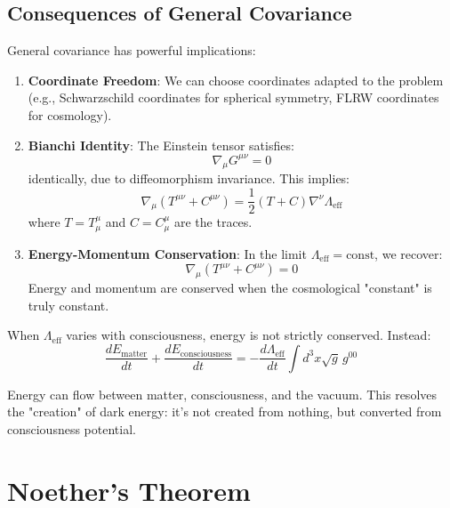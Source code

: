 \subsection{Consequences of General Covariance}

General covariance has powerful implications:

\begin{enumerate}
\item \textbf{Coordinate Freedom}: We can choose coordinates adapted to the problem (e.g., Schwarzschild coordinates for spherical symmetry, FLRW coordinates for cosmology).

\item \textbf{Bianchi Identity}: The Einstein tensor satisfies:
\begin{equation}
\nabla_\mu G^{\mu\nu} = 0
\end{equation}
identically, due to diffeomorphism invariance. This implies:
\begin{equation}
\nabla_\mu \left( T^{\mu\nu} + C^{\mu\nu} \right) = \frac{1}{2}\left( T + C \right) \nabla^\nu \Lambda_{\text{eff}}
\end{equation}
where $T = T^\mu_\mu$ and $C = C^\mu_\mu$ are the traces.

\item \textbf{Energy-Momentum Conservation}: In the limit $\Lambda_{\text{eff}} = \text{const}$, we recover:
\begin{equation}
\nabla_\mu \left( T^{\mu\nu} + C^{\mu\nu} \right) = 0
\end{equation}
Energy and momentum are conserved when the cosmological "constant" is truly constant.
\end{enumerate}

\begin{keyidea}
When $\Lambda_{\text{eff}}$ varies with consciousness, energy is not strictly conserved. Instead:
\begin{equation}
\frac{dE_{\text{matter}}}{dt} + \frac{dE_{\text{consciousness}}}{dt} = -\frac{d\Lambda_{\text{eff}}}{dt} \int d^3x \sqrt{g} \, g^{00}
\end{equation}

Energy can flow between matter, consciousness, and the vacuum. This resolves the "creation" of dark energy: it's not created from nothing, but converted from consciousness potential.
\end{keyidea}

\section{Noether's Theorem}

